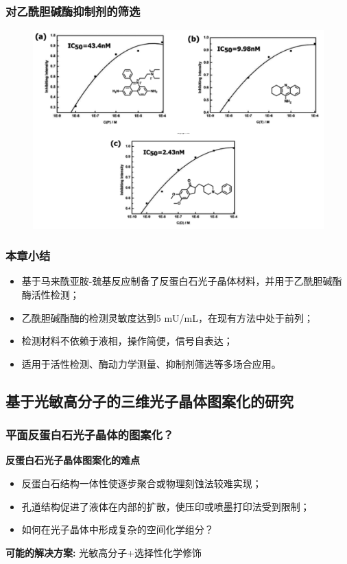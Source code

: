 \documentclass{beamer}
\begin{document}
\begin{frame}
  \frametitle{对乙酰胆碱酶抑制剂的筛选}
  \begin{figure}[htbp]
    \centering
    \includegraphics[width=0.85\linewidth]{figures/inhibitor.png}
  \end{figure}
\end{frame}

\begin{frame}
  \frametitle{本章小结}
  \begin{itemize}
    \item
    基于马来酰亚胺-巯基反应制备了反蛋白石光子晶体材料，并用于乙酰胆碱酯酶活性检测；
    \item
    乙酰胆碱酯酶的检测灵敏度达到5 mU/mL，在现有方法中处于前列；
    \item
    检测材料不依赖于液相，操作简便，信号自表达；
    \item
    适用于活性检测、酶动力学测量、抑制剂筛选等多场合应用。
  \end{itemize}
\end{frame}

\subsection{基于光敏高分子的三维光子晶体图案化的研究}
\begin{frame}
  \frametitle{平面反蛋白石光子晶体的图案化？}
  \textcolor{tsinghua}{\textbf{反蛋白石光子晶体图案化的难点}}
  \begin{itemize}
    \item
    反蛋白石结构一体性使逐步聚合或物理刻蚀法较难实现；
    \item
    孔道结构促进了液体在内部的扩散，使压印或喷墨打印法受到限制；
    \item
    如何在光子晶体中形成复杂的空间化学组分？
  \end{itemize}
  \pause
  \textcolor{tsinghua}{\textbf{可能的解决方案:}}
  光敏高分子+选择性化学修饰
\end{frame}
\end{document}
